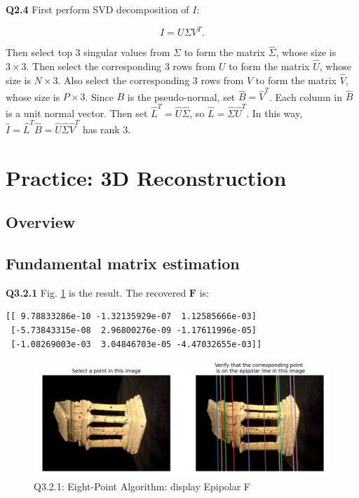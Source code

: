 \documentclass[
  course = {{16-720B Computer Vision}},
  quartile = {{1}},
  assignment = 5\ -\ 3D\ Reconstruction\ \&\ Photometric\ Stereo,
  name = {{Kangle Deng}},
  email = {{kangled@andrew.cmu.edu}},
  firstexercise = 1
]{aga-homework}
\begin{document}
\noindent\textbf{Q2.4} 
First perform SVD decomposition of $I$:

\begin{equation*}
    I = U\Sigma V^T.
\end{equation*}

Then select top 3 singular values from $\Sigma$ to form the matrix $\hat{\Sigma}$, whose size is $3\times3$. Then select the corresponding 3 rows from $U$ to form the matrix $\hat{U}$, whose size is $N \times 3$. Also select the corresponding 3 rows from $V$ to form the matrix $\hat{V}$, whose size is $P \times 3$. Since $B$ is the pseudo-normal, set $\hat{B} = \hat{V}^T$. Each column in $\hat{B}$ is a unit normal vector. Then set $\hat{L}^T=\hat{U}\hat{\Sigma}$, so $\hat{L} = \hat{\Sigma}\hat{U}^T$. In this way, $\hat{I} = \hat{L}^T\hat{B} = \hat{U}\hat{\Sigma}\hat{V}^T$ has rank 3.

\section{Practice: 3D Reconstruction}

\subsection{Overview}

\subsection{Fundamental matrix estimation}
\noindent\textbf{Q3.2.1} Fig. \ref{fig:cv_hw5_q321} is the result. The recovered $\mathbf{F}$ is:
\begin{verbatim}
[[ 9.78833286e-10 -1.32135929e-07  1.12585666e-03]
 [-5.73843315e-08  2.96800276e-09 -1.17611996e-05]
 [-1.08269003e-03  3.04846703e-05 -4.47032655e-03]]
\end{verbatim}

\begin{figure}
    \centering
    \includegraphics[width=.9\textwidth]{CV/fig/hw5/q321.png}
    \caption{Q3.2.1: Eight-Point Algorithm:  display Epipolar F}
    \label{fig:cv_hw5_q321}
\end{figure}
\end{document}
